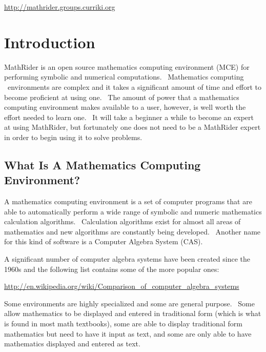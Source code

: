 \documentclass[12pt,twoside]{book}
\begin{document}
\href{http://mathrider.groups.curriki.org}{http://mathrider.groups.curriki.org}



\bigskip

\mainmatter



\chapter[Introduction]{Introduction}
MathRider is an open source mathematics computing environment (MCE) for performing symbolic and numerical computations. \ Mathematics computing \ environments are complex and it takes a significant amount of time and effort to become proficient at using one. \ The amount of power that a mathematics computing environment makes available to a user, however, is well worth the effort needed to learn one. \ It will take a beginner a while to become an expert at using MathRider, but fortunately one does not need to be a MathRider expert in order to begin using it to solve problems.

\section[What Is A Mathematics Computing Environment?]{What Is A Mathematics Computing Environment?}

A mathematics computing environment is a set of computer programs that are able to automatically perform a wide range of symbolic and numeric mathematics calculation algorithms. \ Calculation algorithms exist for almost all areas of mathematics and new algorithms are constantly being developed. \ Another name for this kind of software is a Computer Algebra System (CAS). 

\bigskip

A significant number of computer algebra systems have been created since the 1960s and the following list contains some of the more popular ones:


\bigskip

\href{http://en.wikipedia.org/wiki/Comparison_of_computer_algebra_systems}{http://en.wikipedia.org/wiki/Comparison\_of\_computer\_algebra\_systems}


\bigskip

Some environments are highly specialized and some are general purpose. \ Some allow mathematics to be displayed and entered in traditional form (which is what is found in most math textbooks), some are able to display traditional form mathematics but need to have it input as text, and some are only able to have mathematics displayed and entered as text.
\end{document}
